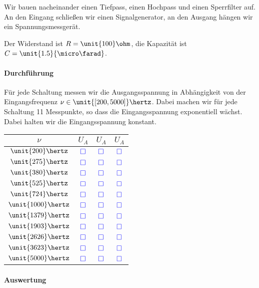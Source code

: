 \documentclass[11pt, ngerman]{article}
\newcommand{\messwert}{\textcolor{blue}{\square}}
\begin{document}
Wir bauen nacheinander einen Tiefpass, einen Hochpass und einen Sperrfilter
auf. An den Eingang schließen wir einen Signalgenerator, an den Ausgang hängen
wir ein Spannungsmessgerät.

Der Widerstand ist $R = \unit{100}\ohm$, die Kapazität ist $C = \unit{1.5}{\micro\farad}$.

\paragraph{Durchführung}

Für jede Schaltung messen wir die Ausgangsspannung in Abhängigkeit von der
Eingangsfrequenz $\nu \in \unit{[200, 5000]}\hertz$. Dabei machen wir für jede
Schaltung 11 Messpunkte, so dass die Eingangsspannung exponentiell wächst.
Dabei halten wir die Eingangsspannung konstant.

\begin{table}[h!]
	\centering
	\begin{tabular}{cccc}
		$\nu$ & $U_A$ & $U_A$ & $U_A$ \\
		\hline
		$\unit{ 200}\hertz$ & $\messwert$ & $\messwert$ & $\messwert$ \\
		$\unit{ 275}\hertz$ & $\messwert$ & $\messwert$ & $\messwert$ \\
		$\unit{ 380}\hertz$ & $\messwert$ & $\messwert$ & $\messwert$ \\
		$\unit{ 525}\hertz$ & $\messwert$ & $\messwert$ & $\messwert$ \\
		$\unit{ 724}\hertz$ & $\messwert$ & $\messwert$ & $\messwert$ \\
		$\unit{1000}\hertz$ & $\messwert$ & $\messwert$ & $\messwert$ \\
		$\unit{1379}\hertz$ & $\messwert$ & $\messwert$ & $\messwert$ \\
		$\unit{1903}\hertz$ & $\messwert$ & $\messwert$ & $\messwert$ \\
		$\unit{2626}\hertz$ & $\messwert$ & $\messwert$ & $\messwert$ \\
		$\unit{3623}\hertz$ & $\messwert$ & $\messwert$ & $\messwert$ \\
		$\unit{5000}\hertz$ & $\messwert$ & $\messwert$ & $\messwert$ \\
	\end{tabular}
\end{table}

\paragraph{Auswertung}
\end{document}

